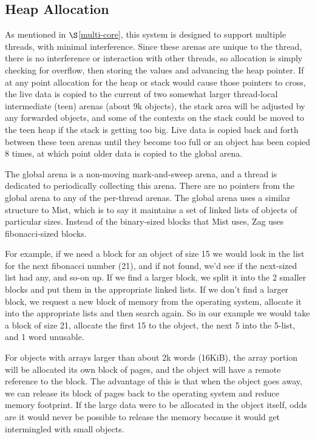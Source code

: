 \documentclass[
]{ceurart}
\def\secref{$\S$\ref}
\begin{document}
\subsection{Heap Allocation}\label{heap-allocation} 
As mentioned in \secref{multi-core}, this system is designed to support multiple threads, with minimal interference.
Since these arenas are unique to the thread, there is no interference or interaction with other threads, so allocation is simply checking for overflow, then storing the values and advancing the heap pointer.
If at any point allocation for the heap or stack would cause those pointers to cross, the live data is copied to the current of two somewhat larger thread-local intermediate (teen) arenas (about 9k objects), the stack area will be adjusted by any forwarded objects, and some of the contexts on the stack could be moved to the teen heap if the stack is getting too big.
Live data is copied back and forth between these teen arenas until they become too full or an object has been copied 8 times, at which point older data is copied to the global arena.

The global arena is a non-moving mark-and-sweep arena, and a thread is dedicated to periodically collecting this arena.
There are no pointers from the global arena to any of the per-thread arenas.
The global arena uses a similar structure to Mist\cite{mist-smalltalk}, which is to say it maintains a set of linked lists of objects of particular sizes.
Instead of the binary-sized blocks that Mist uses, Zag uses fibonacci-sized blocks.

For example, if we need a block for an object of size 15 we would look in the list for the next fibonacci number (21), and if not found, we'd see if the next-sized list had any, and so-on up.
If we find a larger block, we split it into the 2 smaller blocks and put them in the appropriate linked lists.
If we don't find a larger block, we request a new block of memory from the operating system, allocate it into the appropriate lists and then search again.
So in our example we would take a block of size 21, allocate the first 15 to the object, the next 5 into the 5-list, and 1 word unusable.

For objects with arrays larger than about 2k words (16KiB), the array portion will be allocated its own block of pages, and the object will have a remote reference to the block.
The advantage of this is that when the object goes away, we can release its block of pages back to the operating system and reduce memory footprint.
If the large data were to be allocated in the object itself, odds are it would never be possible to release the memory because it would get intermingled with small objects.
\end{document}
